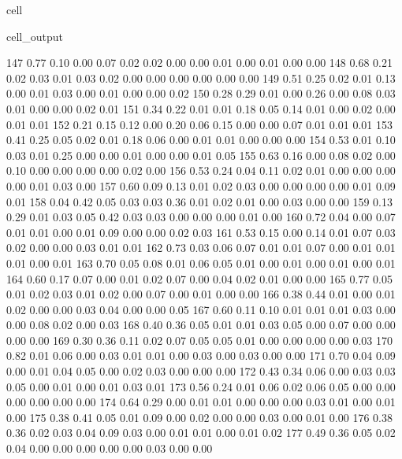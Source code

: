 \documentclass[letterpaper,10pt,english]{jupyterBook}
\begin{document}
\begin{sphinxuseclass}{cell}
\begin{sphinxVerbatimOutput}
\begin{sphinxuseclass}{cell_output}
\begin{sphinxVerbatim}[commandchars=\\\{\}]
       147	0.77 	0.10 	0.00 	0.07 	0.02 	0.02 	0.00 	0.00 	0.01 	0.00 	0.01 	0.00 	0.00
       148	0.68 	0.21 	0.02 	0.03 	0.01 	0.03 	0.02 	0.00 	0.00 	0.00 	0.00 	0.00 	0.00
       149	0.51 	0.25 	0.02 	0.01 	0.13 	0.00 	0.01 	0.03 	0.00 	0.01 	0.00 	0.00 	0.02
       150	0.28 	0.29 	0.01 	0.00 	0.26 	0.00 	0.08 	0.03 	0.01 	0.00 	0.00 	0.02 	0.01
       151	0.34 	0.22 	0.01 	0.01 	0.18 	0.05 	0.14 	0.01 	0.00 	0.02 	0.00 	0.01 	0.01
       152	0.21 	0.15 	0.12 	0.00 	0.20 	0.06 	0.15 	0.00 	0.00 	0.07 	0.01 	0.01 	0.01
       153	0.41 	0.25 	0.05 	0.02 	0.01 	0.18 	0.06 	0.00 	0.01 	0.01 	0.00 	0.00 	0.00
       154	0.53 	0.01 	0.10 	0.03 	0.01 	0.25 	0.00 	0.00 	0.01 	0.00 	0.00 	0.01 	0.05
       155	0.63 	0.16 	0.00 	0.08 	0.02 	0.00 	0.10 	0.00 	0.00 	0.00 	0.00 	0.02 	0.00
       156	0.53 	0.24 	0.04 	0.11 	0.02 	0.01 	0.00 	0.00 	0.00 	0.00 	0.01 	0.03 	0.00
       157	0.60 	0.09 	0.13 	0.01 	0.02 	0.03 	0.00 	0.00 	0.00 	0.00 	0.01 	0.09 	0.01
       158	0.04 	0.42 	0.05 	0.03 	0.03 	0.36 	0.01 	0.02 	0.01 	0.00 	0.03 	0.00 	0.00
       159	0.13 	0.29 	0.01 	0.03 	0.05 	0.42 	0.03 	0.03 	0.00 	0.00 	0.00 	0.01 	0.00
       160	0.72 	0.04 	0.00 	0.07 	0.01 	0.01 	0.00 	0.01 	0.09 	0.00 	0.00 	0.02 	0.03
       161	0.53 	0.15 	0.00 	0.14 	0.01 	0.07 	0.03 	0.02 	0.00 	0.00 	0.03 	0.01 	0.01
       162	0.73 	0.03 	0.06 	0.07 	0.01 	0.01 	0.07 	0.00 	0.01 	0.01 	0.01 	0.00 	0.01
       163	0.70 	0.05 	0.08 	0.01 	0.06 	0.05 	0.01 	0.00 	0.01 	0.00 	0.01 	0.00 	0.01
       164	0.60 	0.17 	0.07 	0.00 	0.01 	0.02 	0.07 	0.00 	0.04 	0.02 	0.01 	0.00 	0.00
       165	0.77 	0.05 	0.01 	0.02 	0.03 	0.01 	0.02 	0.00 	0.07 	0.00 	0.01 	0.00 	0.00
       166	0.38 	0.44 	0.01 	0.00 	0.01 	0.02 	0.00 	0.00 	0.03 	0.04 	0.00 	0.00 	0.05
       167	0.60 	0.11 	0.10 	0.01 	0.01 	0.01 	0.03 	0.00 	0.00 	0.08 	0.02 	0.00 	0.03
       168	0.40 	0.36 	0.05 	0.01 	0.01 	0.03 	0.05 	0.00 	0.07 	0.00 	0.00 	0.00 	0.00
       169	0.30 	0.36 	0.11 	0.02 	0.07 	0.05 	0.05 	0.01 	0.00 	0.00 	0.00 	0.00 	0.03
       170	0.82 	0.01 	0.06 	0.00 	0.03 	0.01 	0.01 	0.00 	0.03 	0.00 	0.03 	0.00 	0.00
       171	0.70 	0.04 	0.09 	0.00 	0.01 	0.04 	0.05 	0.00 	0.02 	0.03 	0.00 	0.00 	0.00
       172	0.43 	0.34 	0.06 	0.00 	0.03 	0.03 	0.05 	0.00 	0.01 	0.00 	0.01 	0.03 	0.01
       173	0.56 	0.24 	0.01 	0.06 	0.02 	0.06 	0.05 	0.00 	0.00 	0.00 	0.00 	0.00 	0.00
       174	0.64 	0.29 	0.00 	0.01 	0.01 	0.00 	0.00 	0.00 	0.03 	0.01 	0.00 	0.01 	0.00
       175	0.38 	0.41 	0.05 	0.01 	0.09 	0.00 	0.02 	0.00 	0.00 	0.03 	0.00 	0.01 	0.00
       176	0.38 	0.36 	0.02 	0.03 	0.04 	0.09 	0.03 	0.00 	0.01 	0.01 	0.00 	0.01 	0.02
       177	0.49 	0.36 	0.05 	0.02 	0.04 	0.00 	0.00 	0.00 	0.00 	0.00 	0.03 	0.00 	0.00
\end{sphinxVerbatim}

\end{sphinxuseclass}\end{sphinxVerbatimOutput}

\end{sphinxuseclass}
\sphinxstepscope
\end{document}
